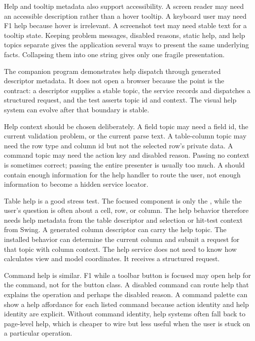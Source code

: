 Help and tooltip metadata also support accessibility. A screen reader may need
an accessible description rather than a hover tooltip. A keyboard user may need
F1 help because hover is irrelevant. A screenshot test may need stable text
for a tooltip state. Keeping problem messages, disabled reasons, static help,
and help topics separate gives the application several ways to present the
same underlying facts. Collapsing them into one string gives only one fragile
presentation.

The \helpServiceExample{} companion program demonstrates help dispatch through
generated descriptor metadata. It does not open a browser because the point is
the contract: a descriptor supplies a stable topic, the service records and
dispatches a structured request, and the test asserts topic id and context.
The visual help system can evolve after that boundary is stable.

Help context should be chosen deliberately. A field topic may need a field id,
the current validation problem, or the current parse text. A table-column
topic may need the row type and column id but not the selected row's private
data. A command topic may need the action key and disabled reason. Passing no
context is sometimes correct; passing the entire presenter is usually too
much. A  should contain enough information for the help
handler to route the user, not enough information to become a hidden service
locator.

Table help is a good stress test. The focused component is only the
, while the user's question is often about a cell, row, or column.
The help behavior therefore needs help metadata from the table descriptor and
selection or hit-test context from Swing. A generated column descriptor can
carry the help topic. The installed behavior can determine the current column
and submit a request for that topic with column context. The help service does
not need to know how  calculates view and model coordinates. It
receives a structured request.

Command help is similar. F1 while a toolbar button is focused may open help
for the command, not for the button class. A disabled command can route help
that explains the operation and perhaps the disabled reason. A command palette
can show a help affordance for each listed command because action identity and
help identity are explicit. Without command identity, help systems often fall
back to page-level help, which is cheaper to wire but less useful when the
user is stuck on a particular operation.

